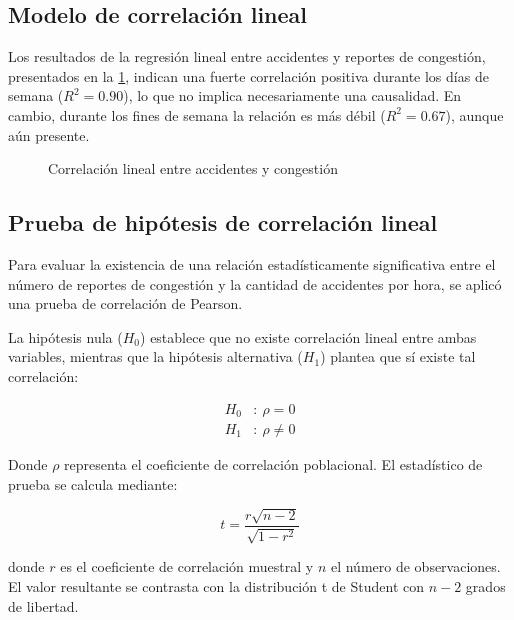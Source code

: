 \documentclass[12pt]{article}
\begin{document}
{\subsection{Modelo de correlación lineal}

Los resultados de la regresión lineal entre accidentes y reportes de congestión, presentados en la \cref{fig:corr_lineal}, indican una fuerte correlación positiva durante los días de semana ($R^2 = 0.90$), lo que no implica necesariamente una causalidad. En cambio, durante los fines de semana la relación es más débil ($R^2 = 0.67$), aunque aún presente.


\begin{figure}[H]
    \centering
    \newline
    \newline
    \caption{Correlación lineal entre accidentes y congestión}
    \label{fig:corr_lineal}
\end{figure}

\subsection{Prueba de hipótesis de correlación lineal}

Para evaluar la existencia de una relación estadísticamente significativa entre el número de reportes de congestión y la cantidad de accidentes por hora, se aplicó una prueba de correlación de Pearson.

La hipótesis nula ($H_0$) establece que no existe correlación lineal entre ambas variables, mientras que la hipótesis alternativa ($H_1$) plantea que sí existe tal correlación:

\begin{align}
H_0&:\ \rho = 0 \\
H_1&:\ \rho \ne 0
\end{align}

Donde $\rho$ representa el coeficiente de correlación poblacional. El estadístico de prueba se calcula mediante:

\begin{equation}
t = \frac{r \sqrt{n - 2}}{\sqrt{1 - r^2}}
\end{equation}

donde $r$ es el coeficiente de correlación muestral y $n$ el número de observaciones. El valor resultante se contrasta con la distribución t de Student con $n - 2$ grados de libertad.

}
\end{document}
